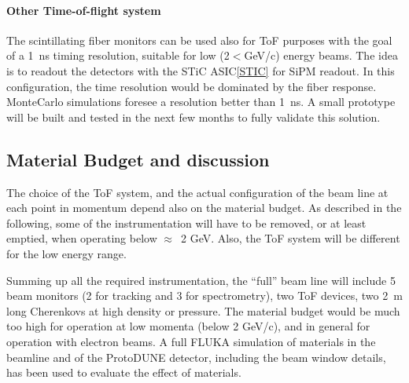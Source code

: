 \paragraph{Other Time-of-flight system}
The  scintillating fiber monitors can be used also for ToF purposes with the goal of a 1~ns timing resolution, suitable for low (2$<$GeV/c) energy beams. The idea is to readout the detectors with the STiC ASIC\ref{STIC} for SiPM readout.
In this configuration, the time resolution would be dominated by the fiber response. MonteCarlo simulations foresee a resolution better than 1~ns. 
A small prototype will be built and tested in the next few months to fully validate this solution.


\subsection{Material Budget and discussion}
The choice of the ToF system, and the actual configuration of the beam line at each point in momentum depend also on the material budget. As described in the following, some of the instrumentation will have to be removed, or at least emptied, when operating below $\approx$~2 GeV. Also, the ToF system will be different for the low energy range.

Summing up all the required instrumentation, the ``full'' beam line will  include
 5 beam monitors (2 for tracking and 3 for spectrometry), two ToF devices, two 2~m long Cherenkovs at high density or pressure. The material budget would be much too high for operation at low momenta (below 2 GeV/c), 
 and in general for operation with electron beams.  
A full FLUKA\cite{fluka05,Fluka15}  simulation of materials in the beamline and of the ProtoDUNE detector, including the beam window details, has been used to evaluate the effect of materials. 


